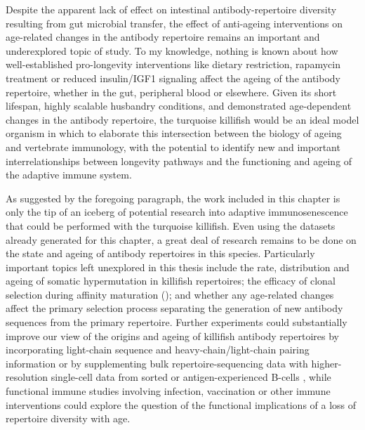 Despite the apparent lack of effect on intestinal antibody-repertoire diversity resulting from gut microbial transfer, the effect of anti-ageing interventions on age-related changes in the antibody repertoire remains an important and underexplored topic of study. To my knowledge, nothing is known about how well-established pro-longevity interventions like dietary restriction, rapamycin treatment or reduced insulin/IGF1 signaling \parencite{lopezotin2013hallmarks} affect the ageing of the antibody repertoire, whether in the gut, peripheral blood or elsewhere. Given its short lifespan, highly scalable husbandry conditions, and demonstrated age-dependent changes in the antibody repertoire, the turquoise killifish would be an ideal model organism in which to elaborate this intersection between the biology of ageing and vertebrate immunology, with the potential to identify new and important interrelationships between longevity pathways and the functioning and ageing of the adaptive immune system.

As suggested by the foregoing paragraph, the work included in this chapter is only the tip of an iceberg of potential research into adaptive immunosenescence that could be performed with the turquoise killifish. Even using the datasets already generated for this chapter, a great deal of research remains to be done on the state and ageing of antibody repertoires in this species. Particularly important topics left unexplored in this thesis include the rate, distribution and ageing of somatic hypermutation in killifish repertoires; the efficacy of clonal selection during affinity maturation (); and whether any age-related changes affect the primary selection process separating the generation of new antibody sequences from the primary \naive repertoire. Further experiments could substantially improve our view of the origins and ageing of killifish antibody repertoires by incorporating light-chain sequence and heavy-chain/light-chain pairing information or by supplementing bulk repertoire-sequencing data with higher-resolution single-cell data from sorted \naive or antigen-experienced B-cells \parencite{friedensohn2017advanced}, while functional immune studies involving infection, vaccination or other immune interventions could explore the question of the functional implications of a loss of repertoire diversity with age.

